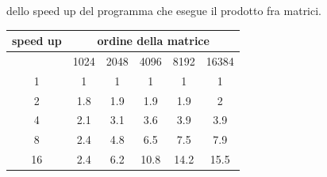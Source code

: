\documentclass[10pt, letterpaper]{report}
\begin{document}
dello speed up del programma che esegue il prodotto fra matrici.\begin{center}
    \begin{tabular}{c|ccccc|}
        \cline{2-6}
        speed up                                                      & \multicolumn{5}{c|}{\cellcolor[HTML]{ECF4FF}ordine della matrice}                                                                                                                                                     \\ \hline
        \rowcolor[HTML]{ECF4FF} 
        \multicolumn{1}{|c|}{\cellcolor[HTML]{FFFFC7}numero processi} & \multicolumn{1}{c|}{\cellcolor[HTML]{ECF4FF}1024} & \multicolumn{1}{c|}{\cellcolor[HTML]{ECF4FF}2048} & \multicolumn{1}{c|}{\cellcolor[HTML]{ECF4FF}4096} & \multicolumn{1}{c|}{\cellcolor[HTML]{ECF4FF}8192} & 16384 \\ \hline
        \multicolumn{1}{|c|}{\cellcolor[HTML]{FFFFC7}1}               & \multicolumn{1}{c|}{1}                            & \multicolumn{1}{c|}{1}                            & \multicolumn{1}{c|}{1}                            & \multicolumn{1}{c|}{1}                            & 1     \\ \hline
        \multicolumn{1}{|c|}{\cellcolor[HTML]{FFFFC7}2}               & \multicolumn{1}{c|}{1.8}                          & \multicolumn{1}{c|}{1.9}                          & \multicolumn{1}{c|}{1.9}                          & \multicolumn{1}{c|}{1.9}                          & 2     \\ \hline
        \multicolumn{1}{|c|}{\cellcolor[HTML]{FFFFC7}4}               & \multicolumn{1}{c|}{2.1}                          & \multicolumn{1}{c|}{3.1}                          & \multicolumn{1}{c|}{3.6}                          & \multicolumn{1}{c|}{3.9}                          & 3.9   \\ \hline
        \multicolumn{1}{|c|}{\cellcolor[HTML]{FFFFC7}8}               & \multicolumn{1}{c|}{2.4}                          & \multicolumn{1}{c|}{4.8}                          & \multicolumn{1}{c|}{6.5}                          & \multicolumn{1}{c|}{7.5}                          & 7.9   \\ \hline
        \multicolumn{1}{|c|}{\cellcolor[HTML]{FFFFC7}16}              & \multicolumn{1}{c|}{2.4}                          & \multicolumn{1}{c|}{6.2}                          & \multicolumn{1}{c|}{10.8}                         & \multicolumn{1}{c|}{14.2}                         & 15.5  \\ \hline
        \end{tabular}
\end{center}
\end{document}
